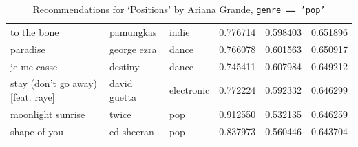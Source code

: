 \documentclass{article}
\begin{document}
\begin{table}[H]
\begin{tabular}{lll|ccc}
to the bone & pamungkas & indie & 0.776714 & 0.598403 & 0.651896 \\
paradise & george ezra & dance & 0.766078 & 0.601563 & 0.650917 \\
je me casse & destiny & dance & 0.745411 & 0.607984 & 0.649212 \\
stay (don't go away) [feat. raye] & david guetta & electronic & 0.772224 & 0.592332 & 0.646299 \\
moonlight sunrise & twice & pop & 0.912550 & 0.532135 & 0.646259 \\
shape of you & ed sheeran & pop & 0.837973 & 0.560446 & 0.643704 \\
\end{tabular}
\vspace{0.5em}
\caption{Recommendations for `Positions' by Ariana Grande, \texttt{genre == 'pop'}}
\end{table}
\end{document}
